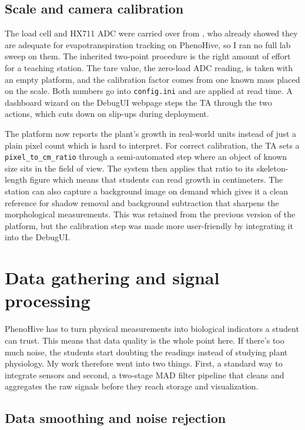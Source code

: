 \clearpage
\subsection{Scale and camera calibration}

The load cell and HX711 ADC were carried over from \textcite{colinet2025}, who already showed they are adequate for evapotranspiration tracking on PhenoHive, so I ran no full lab sweep on them. The inherited two-point procedure is the right amount of effort for a teaching station. The tare value, the zero-load ADC reading, is taken with an empty platform, and the calibration factor comes from one known mass placed on the scale. Both numbers go into \texttt{config.ini} and are applied at read time. A dashboard wizard on the DebugUI webpage steps the TA through the two actions, which cuts down on slip-ups during deployment.

The platform now reports the plant's growth in real-world units instead of just a plain pixel count which is hard to interpret. For correct calibration, the TA sets a \texttt{pixel\_to\_cm\_ratio} through a semi-automated step where an object of known size sits in the field of view. The system then applies that ratio to its skeleton-length figure which means that students can read growth in centimeters. The station can also capture a background image on demand which gives it a clean reference for shadow removal and background subtraction that sharpens the morphological measurements. This was retained from the previous version of the platform, but the calibration step was made more user-friendly by integrating it into the DebugUI.

\section{Data gathering and signal processing}

PhenoHive has to turn physical measurements into biological indicators a student can trust. This means that data quality is the whole point here. If there's too much noise, the students start doubting the readings instead of studying plant physiology. My work therefore went into two things. First, a standard way to integrate sensors and second, a two-stage MAD filter pipeline that cleans and aggregates the raw signals before they reach storage and visualization.

\subsection{Data smoothing and noise rejection}
\label{sec:data-smoothing}

